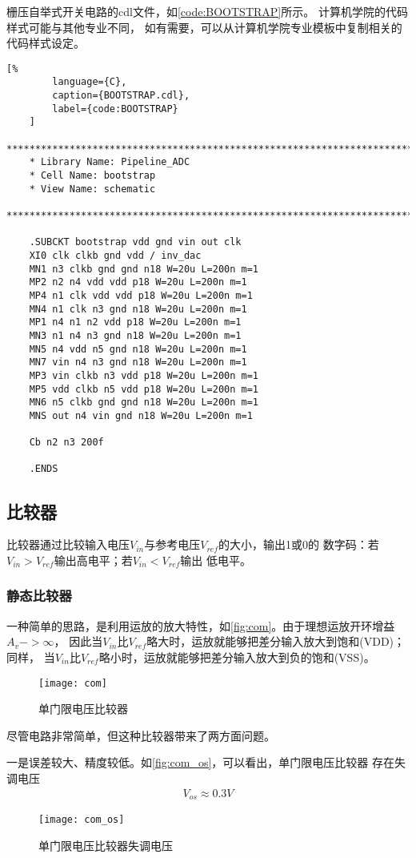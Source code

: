     \par 栅压自举式开关电路的cdl文件，如\autoref{code:BOOTSTRAP}所示。
    计算机学院的代码样式可能与其他专业不同，
    如有需要，可以从计算机学院专业模板中复制相关的代码样式设定。

    \begin{lstlisting}[%
        language={C},
        caption={BOOTSTRAP.cdl},
        label={code:BOOTSTRAP}
    ]
    ********************************************************************************
    * Library Name: Pipeline_ADC
    * Cell Name: bootstrap
    * View Name: schematic
    ********************************************************************************

    .SUBCKT bootstrap vdd gnd vin out clk
    XI0 clk clkb gnd vdd / inv_dac
    MN1 n3 clkb gnd gnd n18 W=20u L=200n m=1
    MP2 n2 n4 vdd vdd p18 W=20u L=200n m=1
    MP4 n1 clk vdd vdd p18 W=20u L=200n m=1
    MN4 n1 clk n3 gnd n18 W=20u L=200n m=1
    MP1 n4 n1 n2 vdd p18 W=20u L=200n m=1
    MN3 n1 n4 n3 gnd n18 W=20u L=200n m=1
    MN5 n4 vdd n5 gnd n18 W=20u L=200n m=1
    MN7 vin n4 n3 gnd n18 W=20u L=200n m=1
    MP3 vin clkb n3 vdd p18 W=20u L=200n m=1
    MP5 vdd clkb n5 vdd p18 W=20u L=200n m=1
    MN6 n5 clkb gnd gnd n18 W=20u L=200n m=1
    MNS out n4 vin gnd n18 W=20u L=200n m=1

    Cb n2 n3 200f

    .ENDS
    \end{lstlisting}


\subsection{比较器}
比较器通过比较输入电压$ V_{in} $与参考电压$ V_{ref} $的大小，输出1或0的
数字码：若$ V_{in} > V_{ref} $输出高电平；若$ V_{in} < V_{ref} $输出
低电平。
    \subsubsection{静态比较器}
    \par 一种简单的思路，是利用运放的放大特性，如\autoref{fig:com}。由于理想运放开环增益$ A_v -> \infty $，
    因此当$ V_{in} $比$ V_{ref} $略大时，运放就能够把差分输入放大到饱和(VDD)；同样，
    当$ V_{in} $比$ V_{ref} $略小时，运放就能够把差分输入放大到负的饱和(VSS)。
    \begin{figure}[H]
        \centering
        \texttt{[image: com]}
        \caption{\label{fig:com}单门限电压比较器}
    \end{figure}
    \par 尽管电路非常简单，但这种比较器带来了两方面问题。
    \par 一是误差较大、精度较低。如\autoref{fig:com_os}，可以看出，单门限电压比较器
    存在失调电压
    \begin{align}
        V_{os} \approx 0.3V
    \end{align}
    \begin{figure}[H]
        \centering
        \texttt{[image: com\_os]}
        \caption{\label{fig:com_os}单门限电压比较器失调电压}
    \end{figure}

